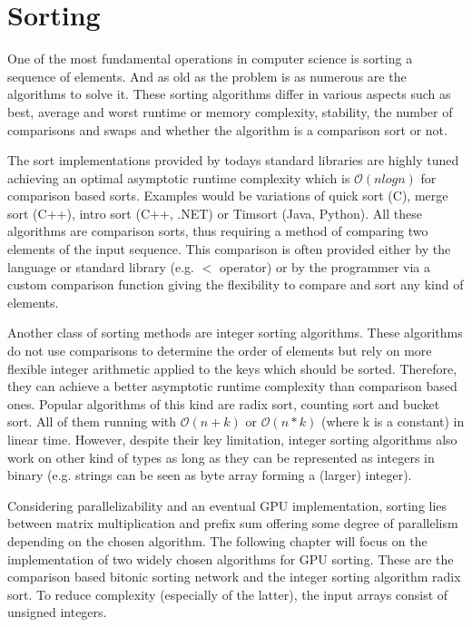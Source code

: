\section{Sorting}
\label{sec:sorting}

One of the most fundamental operations in computer science is sorting a sequence of elements. And as old as the problem is as numerous are the algorithms to solve it. These sorting algorithms differ in various aspects such as best, average and worst runtime or memory complexity, stability, the number of comparisons and swaps and whether the algorithm is a comparison sort or not.

The sort implementations provided by todays standard libraries are highly tuned achieving an optimal asymptotic runtime complexity which is $\mathcal{O}(n log n)$ for comparison based sorts. Examples would be variations of quick sort (C), merge sort (C++), intro sort (C++, .NET) or Timsort (Java, Python). All these algorithms are comparison sorts, thus requiring a method of comparing two elements of the input sequence. This comparison is often provided either by the language or standard library (e.g. $<$ operator) or by the programmer via a custom comparison function giving the flexibility to compare and sort any kind of elements.

Another class of sorting methods are integer sorting algorithms. These algorithms do not use comparisons to determine the order of elements but rely on more flexible integer arithmetic applied to the keys which should be sorted. Therefore, they can achieve a better asymptotic runtime complexity than comparison based ones. Popular algorithms of this kind are radix sort, counting sort and bucket sort. All of them running with $\mathcal{O}(n + k)$ or $\mathcal{O}(n * k)$ (where k is a constant) in linear time.
However, despite their key limitation, integer sorting algorithms also work on other kind of types as long as they can be represented as integers in binary (e.g. strings can be seen as byte array forming a (larger) integer).

Considering parallelizability and an eventual GPU implementation, sorting lies between matrix multiplication and prefix sum offering some degree of parallelism depending on the chosen algorithm. The following chapter will focus on the implementation of two widely chosen algorithms for GPU sorting. These are the comparison based bitonic sorting network and the integer sorting algorithm radix sort. To reduce complexity (especially of the latter), the input arrays consist of unsigned integers.


